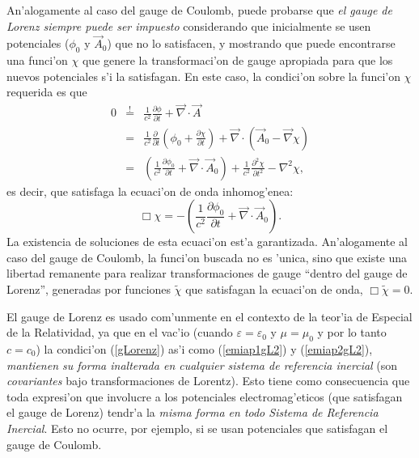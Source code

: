 An'alogamente al caso del gauge de Coulomb, puede probarse que \textit{el gauge de Lorenz siempre puede ser impuesto} considerando que inicialmente se usen potenciales ($\phi_0$ y $\vec{A}_0$) que no lo satisfacen, y mostrando que puede encontrarse una funci'on $\chi$ que genere la transformaci'on de gauge apropiada para que los nuevos potenciales s'i la satisfagan. En este caso, la condici'on sobre la funci'on $\chi$ requerida es que
\begin{eqnarray}
0&\stackrel{!}{=}&\frac{1}{c^2}\frac{\partial\phi}{\partial t}+\vec{\nabla}\cdot\vec{A} \\
&=&\frac{1}{c^2}\frac{\partial\ }{\partial t}\left(\phi_0+\frac{\partial\chi}{\partial t}\right)+\vec{\nabla}\cdot\left(\vec{A}_0-\vec\nabla\chi\right) \\
&=&\left(\frac{1}{c^2}\frac{\partial\phi_0}{\partial t} +\vec{\nabla}\cdot\vec{A}_0\right) +\frac{1}{c^2}\frac{\partial^2\chi }{\partial t^2}-\nabla^2\chi,
\end{eqnarray}
es decir, que satisfaga la ecuaci'on de onda inhomog'enea:
\begin{equation}
\Box\chi=-\left(\frac{1}{c^2}\frac{\partial\phi_0}{\partial t} +\vec{\nabla}\cdot\vec{A}_0\right).
\end{equation}
La existencia de soluciones de esta ecuaci'on est'a garantizada. An'alogamente al caso del gauge de Coulomb, la funci'on buscada no es 'unica, sino que existe una libertad remanente para realizar transformaciones de gauge ``dentro del gauge de Lorenz'', generadas por funciones $\tilde\chi$ que satisfagan la ecuaci'on de onda, $\Box\tilde\chi=0$. 

El gauge de Lorenz es usado com'unmente en el contexto de la teor'ia de Especial de la Relatividad, ya que en el vac'io (cuando $\varepsilon=\varepsilon_0$ y $\mu=\mu_0$ y por lo tanto $c=c_0$) la condici'on (\ref{gLorenz}) as'i como (\ref{emiap1gL2}) y (\ref{emiap2gL2}), \textit{mantienen su forma inalterada en cualquier sistema de referencia inercial} (son \textit{covariantes} bajo transformaciones de Lorentz). Esto tiene como consecuencia que toda expresi'on que involucre a los potenciales electromag'eticos (que satisfagan el gauge de Lorenz) tendr'a la \textit{misma forma en todo Sistema de Referencia Inercial}. Esto no ocurre, por ejemplo, si se usan potenciales que satisfagan el gauge de Coulomb.